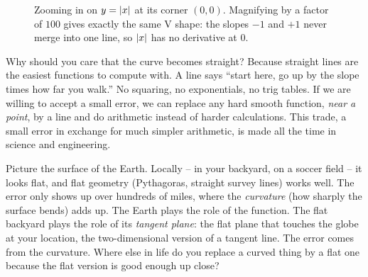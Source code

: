 \begin{figure}[htbp]
\centering
{}
\hspace{0.6cm}
\caption{Zooming in on $y=\lvert x\rvert$ at its corner $(0,0)$. Magnifying by a factor of
$100$ gives exactly the same V shape: the slopes $-1$ and $+1$ never merge into one
line, so $\lvert x\rvert$ has no derivative at $0$.}
\label{ch14:fig-corner}
\end{figure}

Why should you care that the curve becomes straight? Because straight lines are
the easiest functions to compute with. A line says ``start
here, go up by the slope times how far you walk.'' No squaring, no exponentials,
no trig tables. If we are willing to accept a small error, we can replace any
hard smooth function, \emph{near a point}, by a line and do arithmetic instead of
harder calculations. This trade, a small error in exchange for much simpler
arithmetic, is made all the time in science and engineering.

\begin{walkbox}
Picture the surface of the Earth. Locally -- in your backyard, on a soccer field
-- it looks flat, and flat geometry (Pythagoras, straight survey lines)
works well. The error only shows up over hundreds of miles, where the
\emph{curvature} (how sharply the surface bends) adds up. The Earth plays the role
of the function. The flat backyard plays the role of its \emph{tangent plane}: the
flat plane that touches the globe at your location, the two-dimensional version of
a tangent line. The error comes from the curvature. Where else in life do you
replace a curved thing by a flat one because the flat version is good enough up
close?
\end{walkbox}

